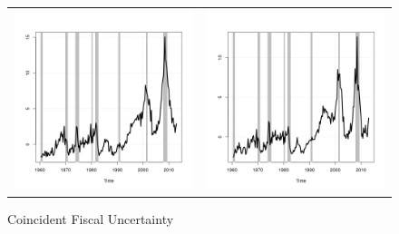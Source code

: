 \documentclass[11pt]{article}
\begin{document}
\begin{figure}\caption{Coincident Fiscal Uncertainty}\label{fg:fpucoin}
\hspace*{-0.3in}\begin{tabular}{cc}
\includegraphics[scale=0.5]{./results/pics0.01/fpucoin.png} & \includegraphics[scale=0.5]{./results/pics0.02/fpucoin.png} \\ 

\end{tabular}
\end{figure}
\end{document}
